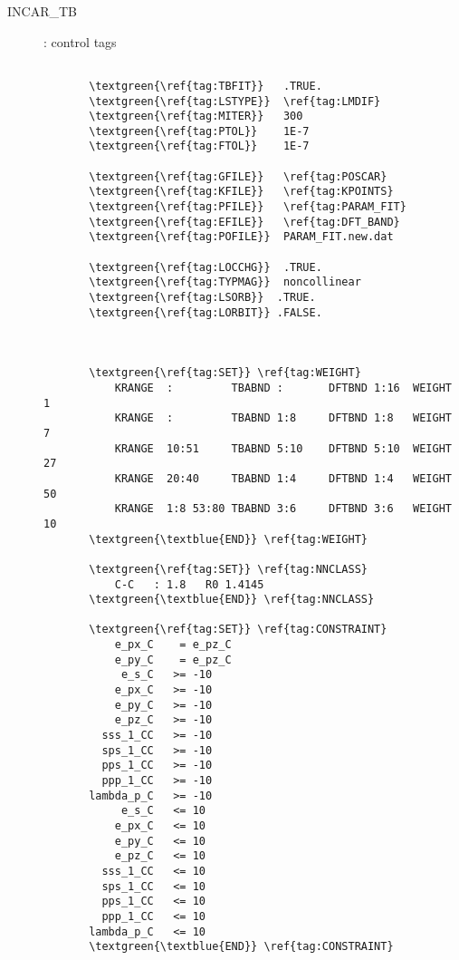 \documentclass[a4paper,12pt]{scrartcl}
\makeatletter
\def\namedlabel#1#2{\begingroup
    #2%
    \def\@currentlabel{#2}%
    \phantomsection\label{#1}\endgroup
}
\newcommand{\textblue}[1]{\textcolor{blue!85!white}{\texttt{#1}}}
\newcommand{\textgreen}[1]{\textcolor{green!50!black}{\texttt{#1}}}
\makeatother
\begin{document}
		
			\begin{description}
			\item[\namedlabel{tag:INCAR_TB}{INCAR\_TB}] : control tags
\begin{Verbatim}[commandchars=\\\{\},gobble=4, frame=single, framesep=2mm, 
    label= example of INCAR-TB for Graphene,
    labelposition=bottomline]
     	
       \textgreen{\ref{tag:TBFIT}}   .TRUE.  
       \textgreen{\ref{tag:LSTYPE}}  \ref{tag:LMDIF} 
       \textgreen{\ref{tag:MITER}}   300  
       \textgreen{\ref{tag:PTOL}}    1E-7  
       \textgreen{\ref{tag:FTOL}}    1E-7  

       \textgreen{\ref{tag:GFILE}}   \ref{tag:POSCAR}  
       \textgreen{\ref{tag:KFILE}}   \ref{tag:KPOINTS}  
       \textgreen{\ref{tag:PFILE}}   \ref{tag:PARAM_FIT}
       \textgreen{\ref{tag:EFILE}}   \ref{tag:DFT_BAND} 
       \textgreen{\ref{tag:POFILE}}  PARAM_FIT.new.dat  

       \textgreen{\ref{tag:LOCCHG}}  .TRUE.  
       \textgreen{\ref{tag:TYPMAG}}  noncollinear  
       \textgreen{\ref{tag:LSORB}}  .TRUE.  
       \textgreen{\ref{tag:LORBIT}} .FALSE.  

     

       \textgreen{\ref{tag:SET}} \ref{tag:WEIGHT}  
           KRANGE  :         TBABND :       DFTBND 1:16  WEIGHT 1
           KRANGE  :         TBABND 1:8     DFTBND 1:8   WEIGHT 7
           KRANGE  10:51     TBABND 5:10    DFTBND 5:10  WEIGHT 27
           KRANGE  20:40     TBABND 1:4     DFTBND 1:4   WEIGHT 50
           KRANGE  1:8 53:80 TBABND 3:6     DFTBND 3:6   WEIGHT 10
       \textgreen{\textblue{END}} \ref{tag:WEIGHT}  
       
       \textgreen{\ref{tag:SET}} \ref{tag:NNCLASS}  
           C-C   : 1.8   R0 1.4145
       \textgreen{\textblue{END}} \ref{tag:NNCLASS}  

       \textgreen{\ref{tag:SET}} \ref{tag:CONSTRAINT}  
           e_px_C    = e_pz_C
           e_py_C    = e_pz_C
            e_s_C   >= -10
           e_px_C   >= -10
           e_py_C   >= -10
           e_pz_C   >= -10
         sss_1_CC   >= -10
         sps_1_CC   >= -10
         pps_1_CC   >= -10
         ppp_1_CC   >= -10
       lambda_p_C   >= -10
            e_s_C   <= 10
           e_px_C   <= 10
           e_py_C   <= 10
           e_pz_C   <= 10
         sss_1_CC   <= 10
         sps_1_CC   <= 10
         pps_1_CC   <= 10
         ppp_1_CC   <= 10
       lambda_p_C   <= 10           
       \textgreen{\textblue{END}} \ref{tag:CONSTRAINT}  
\end{Verbatim}
		

\end{description}
\end{document}
